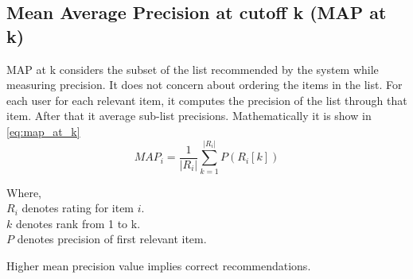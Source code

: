 \subsection{Mean Average Precision at cutoff k (MAP at k)}
MAP at k considers the subset of the list recommended by the system while measuring precision. It does not concern about ordering the items in the list. For each user for each relevant item, it computes the precision of the list through that item. After that it average sub-list precisions. Mathematically it is show in \autoref{eq:map_at_k}
\begin{equation}
MAP_{i} = \frac{1}{\vert R_{i} \vert} \sum_{k=1}^{\vert R_{i} \vert} { P( R_{i}[k]) }
\label{eq:map_at_k}
\end{equation}

\noindent Where, \\
$R_{i}$ denotes rating for item $i$. \\
$k$ denotes rank from 1 to k.\\
$P$ denotes precision of first relevant item.

\noindent Higher mean precision value implies correct recommendations.

